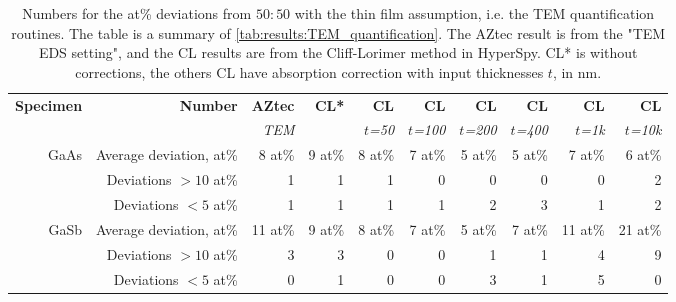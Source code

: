 \begin{table}[phtb]
    \begin{center}
        \caption{
            Numbers for the at\% deviations from $50:50$ with the thin film assumption, i.e. the TEM quantification routines.
            The table is a summary of \cref{tab:results:TEM_quantification}.
            The AZtec result is from the "TEM EDS setting", and the CL results are from the Cliff-Lorimer method in HyperSpy.
            CL* is without corrections, the others CL have absorption correction with input thicknesses $t$, in nm.
        }
        \label{tab:results:TEM_quantification_stats}
        \begin{tabular}{rrrrrrrrrr}
            \hline
            \textbf{Specimen} & \textbf{Number}         & \textbf{AZtec} & \textbf{CL*} & \textbf{CL}   & \textbf{CL}    & \textbf{CL}    & \textbf{CL}    & \textbf{CL}   & \textbf{CL}    \\
            \emph{}           & \emph{}                 & \emph{TEM}        & \emph{}      & \emph{$t$=50} & \emph{$t$=100} & \emph{$t$=200} & \emph{$t$=400} & \emph{$t$=1k} & \emph{$t$=10k} \\
            \hline
            GaAs              & Average deviation, at\% & 8 at\%         & 9 at\%       & 8 at\%        & 7 at\%         & 5 at\%         & 5 at\%         & 7 at\%        & 6 at\%         \\
                              & Deviations $>10$ at\%   & 1              & 1            & 1             & 0              & 0              & 0              & 0             & 2              \\
                              & Deviations  $<5$  at\%  & 1              & 1            & 1             & 1              & 2              & 3              & 1             & 2              \\
            \hline
            GaSb              & Average deviation, at\% & 11 at\%        & 9 at\%       & 8 at\%        & 7 at\%         & 5 at\%         & 7 at\%         & 11 at\%       & 21 at\%        \\
                              & Deviations $>10$ at\%   & 3              & 3            & 0             & 0              & 1              & 1              & 4             & 9              \\
                              & Deviations  $<5$  at\%  & 0              & 1            & 0             & 0              & 3              & 1              & 5             & 0              \\
            \hline
        \end{tabular}
    \end{center}
\end{table}

